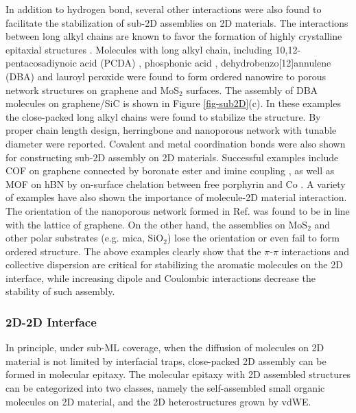 In addition to hydrogen bond, several other interactions were also
found to facilitate the stabilization of sub-2D assemblies on 2D
materials. The interactions between long alkyl chains are known to
favor the formation of highly crystalline epitaxial structures
\cite{De_Feyter_2003_2D_assem_rev}. Molecules with long alkyl chain,
including 10,12-pentacosadiynoic acid (PCDA)
\cite{Deshpande_2012_1D_assemb_gr}, phosphonic acid
\cite{Prado_2011_2D_acid_gr}, dehydrobenzo[12]annulene (DBA) and lauroyl
peroxide \cite{Huang_2016_laury_nanowire_gr} were found to form ordered
nanowire to porous network structures on graphene and MoS\(_{\text{2}}\)
surfaces. The assembly of DBA molecules on graphene/SiC is shown in
Figure \ref{fig-sub2D}(c). In these examples the close-packed long alkyl
chains were found to stabilize the structure. By proper chain length
design, herringbone \cite{Deshpande_2012_1D_assemb_gr} and nanoporous
network with tunable diameter \cite{Li_2013_porous_assem_gr} were
reported. Covalent and metal coordination bonds were also shown for
constructing sub-2D assembly on 2D materials. Successful examples
include COF on graphene connected by boronate ester
\cite{Colson_2011_2DMOF_gr,Colson_2014_2D_COF_gr} and imine coupling
\cite{Sun_2017_cof_gr}, as well as MOF on hBN by on-surface chelation
between free porphyrin and Co \cite{Urgel_2015_MOF_BN}.  A variety of
examples have also shown the importance of molecule-2D material
interaction. The orientation of the nanoporous network formed in
Ref.  was
found to be in line with the lattice of graphene. On the other hand,
the assemblies on MoS\(_{\text{2}}\) \cite{Huang_2016_laury_nanowire_gr} and other
polar substrates (e.g. mica, SiO\(_{\text{2}}\))
\cite{Karmel_2014_assembl_hetero_gr,Deshpande_2012_1D_assemb_gr,Huang_2016_laury_nanowire_gr}
lose the orientation or even fail to form ordered structure. The
above examples clearly show that the \(\pi\)-\(\pi\) interactions and
collective dispersion are critical for stabilizing the aromatic
molecules on the 2D interface, while increasing dipole and Coulombic
interactions decrease the stability of such assembly.


\subsubsection{2D-2D Interface}
\label{sec:org1d44ccd}

In principle, under sub-ML coverage, when the diffusion of molecules on  2D
material is not limited by interfacial traps, close-packed 2D assembly
can be formed in molecular epitaxy. The molecular epitaxy with
2D assembled structures can be categorized into two classes, namely the
self-assembled small organic molecules on 2D material, and the
2D heterostructures grown by vdWE.

